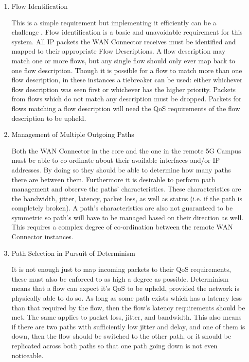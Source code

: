 \begin{enumerate}
  \item Flow Identification


This is a simple requirement but implementing it efficiently can be a challenge \cite{tongaonkar2004fast}. Flow identification is a basic and unavoidable requirement for this system. All IP packets the WAN Connector receives must be identified and mapped to their appropriate Flow Descriptions. A flow description may match one or more flows, but any single flow should only ever map back to one flow description. Though it is possible for a flow to match more than one flow description, in these instances a tiebreaker can be used: either whichever flow description was seen first or whichever has the higher priority. Packets from flows which do not match any description must be dropped. Packets for flows matching a flow description will need the QoS requirements of the flow description to be upheld.


  \item Management of Multiple Outgoing Paths

Both the WAN Connector in the core and the one in the remote 5G Campus must be able to co-ordinate about their available interfaces and/or IP addresses. By doing so they should be able to determine how many paths there are between them. Furthermore it is desirable to perform path management and observe the paths' characteristics. These characteristics are the bandwidth, jitter, latency, packet loss, as well as status (i.e. if the path is completely broken). A path's characteristics are also not guaranteed to be symmetric so path's will have to be managed based on their direction as well. This requires a complex degree of co-ordination between the remote WAN Connector instances. 

  \item Path Selection in Pursuit of Determinism

It is not enough just to map incoming packets to their QoS requirements, these must also be enforced to as high a degree as possible.  Determinism means that a flow can expect it's QoS to be upheld, provided the network is physically able to do so. As long as some path exists which has a latency less than that required by the flow, then the flow's latency requirements should be met. The same applies to packet loss, jitter, and bandwidth. This also means if there are two paths with sufficiently low jitter and delay, and one of them is down, then the flow should be switched to the other path, or it should be replicated across both paths so that one path going down is not even noticeable.


\end{enumerate}
